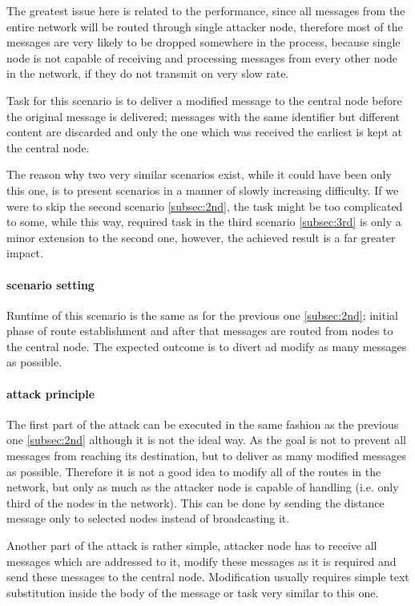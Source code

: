 \documentclass[
  print, %
  Table,   %
  nolof,     %
  nolot,     %
           oneside
]{fithesis3}
\begin{document}
    The greatest issue here is related to the performance, since all messages from the entire network will be routed through single attacker node, therefore most of the messages are very likely to be dropped somewhere in the process, because single node is not capable of receiving and processing messages from every other node in the network, if they do not transmit on very slow rate.

    Task for this scenario is to deliver a modified message to the central node before the original message is delivered; messages with the same identifier but different content are discarded and only the one which was received the earliest is kept at the central node.

    The reason why two very similar scenarios exist, while it could have been only this one, is to present scenarios in a manner of slowly increasing difficulty. If we were to skip the second scenario \ref{subsec:2nd}, the task might be too complicated to some, while this way, required task in the third scenario \ref{subsec:3rd} is only a minor extension to the second one, however, the achieved result is a far greater impact.

    \paragraph{scenario setting}
    Runtime of this scenario is the same as for the previous one \ref{subsec:2nd}; initial phase of route establishment and after that messages are routed from nodes to the central node. The expected outcome is to divert ad modify as many messages as possible.

    \paragraph{attack principle}
    The first part of the attack can be executed in the same fashion as the previous one \ref{subsec:2nd} although it is not the ideal way. As the goal is not to prevent all messages from reaching its destination, but to deliver as many modified messages as possible. Therefore it is not a good idea to modify all of the routes in the network, but only as much as the attacker node is capable of handling (i.e. only third of the nodes in the network). This can be done by sending the distance message only to selected nodes instead of broadcasting it.

    Another part of the attack is rather simple, attacker node has to receive all messages which are addressed to it, modify these messages as it is required and send these messages to the central node. Modification usually requires simple text substitution inside the body of the message or task very similar to this one.
\end{document}
